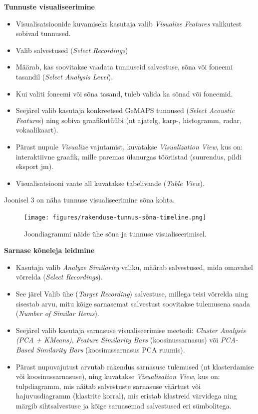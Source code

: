\textbf{Tunnuste visualiseerimine
}
\begin{itemize}
    \item Visualisatsioonide kuvamiseks kasutaja valib \textit{Visualize Features} valikutest sobivad tunnused.
    \item Valib salvestused (\textit{Select Recordings})
    \item Määrab, kas soovitakse vaadata tunnuseid salvestuse, sõna või foneemi tasandil (\textit{Select Analysis Level}).
    \item Kui valiti foneemi või sõna tasand, tuleb valida ka sõnad või foneemid.
    \item Seejärel valib kasutaja konkreetsed GeMAPS tunnused (\textit{Select Acoustic Feature}s) ning sobiva graafikutüübi (nt ajatelg, karp-, histogramm, radar, vokaalikaart).
    \item Pärast nupule \textit{Visualize} vajutamist, kuvatakse \textit{Visualization View}, kus on: interaktiivne graafik, mille paremas ülanurgas tööriistad (suurendus, pildi eksport jm).
    \item Visualisatsiooni vaate all kuvatakse tabelivaade (\textit{Table View}).
\end{itemize}
Joonisel 3 on näha tunnuse visualiseerimine sõna kohta.
\begin{figure}[H]
    \centering
    \texttt{[image: figures/rakenduse-tunnus-sõna-timeline.png]}
    \caption{Joondiagrammi näide ühe sõna ja tunnuse visualiseerimisel.}
    \label{fig:rakenduse-tunnus-sõna-timeline.png}
\end{figure}

\textbf{Sarnase kõneleja leidmine}
\begin{itemize}
    \item Kasutaja valib \textit{Analyze Similarity} valiku, määrab salvestused, mida omavahel võrrelda (\textit{Select Recordings}).
    \item See järel Valib ühe (\textit{Target Recording}) salvestuse, millega teisi võrrelda ning sisestab arvu, mitu kõige sarnasemat salvestust soovitakse tulemusena saada (\textit{Number of Similar Items}).
    \item Seejärel valib kasutaja sarnasuse visualiseerimise meetodi: \textit{Cluster Analysis (PCA + KMeans)}, \textit{Feature Similarity Bars} (koosinussarnasus) või \textit{PCA-Based Similarity Bars} (koosinussarnasus PCA ruumis).
    \item Pärast nupuvajutust arvutab rakendus sarnasuse tulemused (nt klasterdamise või koosinussarnasuse), ning kuvatakse \textit{Visualisation View}, kus on: tulpdiagramm, mis näitab salvestuste sarnasuse väärtust või hajuvusdiagramm (klastrite korral), mis eristab klastreid värvidega ning märgib sihtsalvestuse ja kõige sarnasemad salvestused eri sümbolitega.
\end{itemize}

